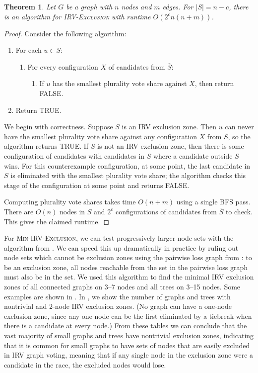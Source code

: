 \documentclass{article}
\theoremstyle{theorem}
\newtheorem{theorem}{Theorem}
\theoremstyle{definition}
\begin{document}
\begin{theorem}\label{thm:fpt}
Let $G$ be a graph with $n$ nodes and $m$ edges. For $|S| = n - c$, there is an algorithm for \textsc{IRV-Exclusion} with runtime $O(2^c n(n+m))$.
\end{theorem}
\begin{proof}
  Consider the following algorithm:
  \begin{enumerate}
    \item For each $u \in S$:
    \begin{enumerate}
    \item For every configuration $X$ of candidates from $\overline S$:
    \begin{enumerate}
    \item If $u$ has the smallest plurality vote share against $X$, then return FALSE. 
    \end{enumerate}
    \end{enumerate}
    \item Return TRUE.
  \end{enumerate}

We begin with correctness. Suppose $S$ is an IRV exclusion zone. Then $u$ can never have the smallest plurality vote share against any configuration $X$ from $\overline S$, so the algorithm returns TRUE. If $S$ is not an IRV exclusion zone, then there is some configuration of candidates with candidates in $S$ where a candidate outside $S$ wins. For this counterexample configuration, at some point, the last candidate in $S$ is eliminated with the smallest plurality vote share; the algorithm checks this stage of the configuration at some point and returns FALSE.
  
  Computing plurality vote shares takes time $O(n+m)$ using a single BFS pass. There are $O(n)$ nodes in $S$ and $2^c$ configurations of candidates from  $\overline S$ to check. This gives the claimed runtime.
  \end{proof}
  
For \textsc{Min-IRV-Exclusion}, we can test progressively larger node sets with the algorithm from . We can speed this up dramatically in practice by ruling out node sets which cannot be exclusion zones using the pairwise loss graph from : to be an exclusion zone, all nodes reachable from the set in the pairwise loss graph must also be in the set. We used this algorithm to find the minimal IRV exclusion zones of all  connected graphs on 3--7 nodes and all trees on 3--15 nodes. Some examples are shown in . In , we show the number of graphs and trees with nontrivial and 2-node IRV exclusion zones. (No graph can have a one-node exclusion zone, since any one node can be the first eliminated by a tiebreak when there is a candidate at every node.) From these tables we can conclude that the vast majority of small graphs and trees have nontrivial exclusion zones, indicating that it is common for small graphs to have sets of nodes that are easily excluded in IRV graph voting, meaning that if any single node in the exclusion zone were a candidate in the race, the excluded nodes would lose.  
\end{document}
